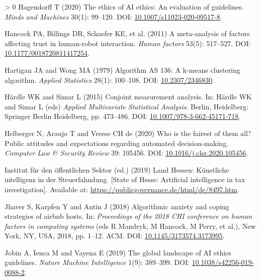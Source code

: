 \documentclass{article}
\newlength{\cslhangindent}
\newenvironment{CSLReferences}[3] %
 {%
  \setlength{\parindent}{0pt}
  \ifodd #1 \everypar{\setlength{\hangindent}{\cslhangindent}}\ignorespaces\fi
  \ifnum #2 > 0
  \setlength{\parskip}{#2\baselineskip}
  \fi
 }%
 {}
\begin{document}
\begin{CSLReferences}{1}{0}
\leavevmode\hypertarget{ref-Hagendorff.2020}{}%
Hagendorff T (2020) The ethics of AI ethics: An evaluation of
guidelines. \emph{Minds and Machines} 30(1): 99--120. DOI:
\href{https://doi.org/10.1007/s11023-020-09517-8}{10.1007/s11023-020-09517-8}.

\leavevmode\hypertarget{ref-Hancock.2011}{}%
Hancock PA, Billings DR, Schaefer KE, et al. (2011) A meta-analysis of
factors affecting trust in human-robot interaction. \emph{Human factors}
53(5): 517--527. DOI:
\href{https://doi.org/10.1177/0018720811417254}{10.1177/0018720811417254}.

\leavevmode\hypertarget{ref-Hartigan.1979}{}%
Hartigan JA and Wong MA (1979) Algorithm AS 136: A k-means clustering
algorithm. \emph{Applied Statistics} 28(1): 100--108. DOI:
\href{https://doi.org/10.2307/2346830}{10.2307/2346830}.

\leavevmode\hypertarget{ref-Hardle.2015}{}%
Härdle WK and Simar L (2015) Conjoint measurement analysis. In: Härdle
WK and Simar L (eds) \emph{Applied Multivariate Statistical Analysis}.
Berlin, Heidelberg: {Springer Berlin Heidelberg}, pp. 473--486. DOI:
\href{https://doi.org/10.1007/978-3-662-45171-718}{10.1007/978-3-662-45171-718}.

\leavevmode\hypertarget{ref-Helberger.2020}{}%
Helberger N, Araujo T and Vreese CH de (2020) Who is the fairest of them
all? Public attitudes and expectations regarding automated
decision-making. \emph{Computer Law {\&} Security Review} 39: 105456.
DOI:
\href{https://doi.org/10.1016/j.clsr.2020.105456}{10.1016/j.clsr.2020.105456}.

\leavevmode\hypertarget{ref-InstitutfurdenoffentlichenSektor.2019}{}%
Institut für den öffentlichen Sektor (ed.) (2019) Land Hessen:
K{ü}nstliche intelligenz in der Steuerfahndung. [State of Hesse: Artificial intelligence in tax investigation]. Available at:
\url{https://publicgovernance.de/html/de/8497.htm}.

\leavevmode\hypertarget{ref-Jhaver.2018}{}%
Jhaver S, Karpfen Y and Antin J (2018) Algorithmic anxiety and coping
strategies of airbnb hosts. In: \emph{Proceedings of the 2018 CHI
conference on human factors in computing systems} (eds R Mandryk, M
Hancock, M Perry, et al.), New York, NY, USA, 2018, pp. 1--12. ACM. DOI:
\href{https://doi.org/10.1145/3173574.3173995}{10.1145/3173574.3173995}.

\leavevmode\hypertarget{ref-Jobin.2019}{}%
Jobin A, Ienca M and Vayena E (2019) The global landscape of AI ethics
guidelines. \emph{Nature Machine Intelligence} 1(9): 389--399. DOI:
\href{https://doi.org/10.1038/s42256-019-0088-2}{10.1038/s42256-019-0088-2}.


\end{CSLReferences}
\end{document}
